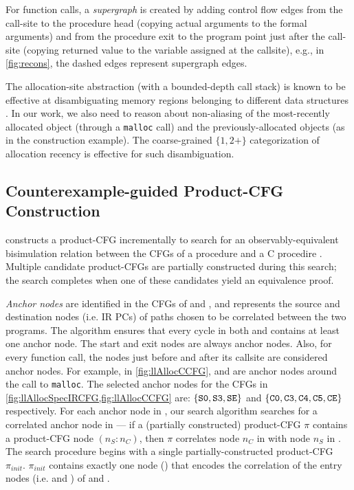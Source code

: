 For function calls, a {\em supergraph} is created by adding control flow edges
from the call-site to the procedure head (copying actual arguments to the formal arguments) and
from the procedure exit to the program point just after the
call-site (copying returned value to the variable assigned at the callsite),
e.g., in \cref{fig:recons}, the dashed edges represent supergraph edges.

The allocation-site abstraction (with a bounded-depth call stack) is
known to be effective at disambiguating memory regions belonging to
different data structures
\cite{allocationSiteAbstraction82,allocationSiteAbstraction90,allocationSiteAbstraction06}.
In our work, we also need to reason about non-aliasing
of the most-recently allocated object (through a {\tt malloc} call) and
the previously-allocated objects (as in the 
construction example). The coarse-grained $\{1, 2+\}$
categorization of allocation recency is effective for such disambiguation.

\subsection{Counterexample-guided Product-CFG Construction}
\label{sec:searchalgo}
\toolName{} constructs a product-CFG incrementally to search for an observably-equivalent
bisimulation relation between the CFGs of a \SpecL{} procedure \sprog{} and a C procedire \cprog{}.
Multiple candidate product-CFGs are partially constructed during this search;
the search completes when one of these candidates yield an equivalence proof.

{\em Anchor nodes} are identified in the CFGs of \sprog{} and \cprog{}, and represents the
source and destination nodes (i.e. IR PCs)
of paths chosen to be correlated between the two programs.
The algorithm ensures that every cycle in both \sprog{} and \cprog{} contains at least one anchor node.
The start and exit nodes are always anchor nodes.
Also, for every function call, the nodes just before and after its callsite are considered anchor nodes.
For example, in \cref{fig:llAllocCCFG},  and  are anchor nodes around the call to {\tt malloc}.
The selected anchor nodes for the CFGs in \cref{fig:llAllocSpecIRCFG,fig:llAllocCCFG} are:
$\{ {\tt S0},{\tt S3},{\tt SE} \}$ and $\{ {\tt C0}, {\tt C3}, {\tt C4}, {\tt C5}, {\tt CE} \}$ respectively.
For each anchor node in \cprog{}, our search algorithm searches for a correlated anchor node in \sprog{} --- if
a (partially constructed) product-CFG $\pi$ contains a product-CFG node  $(n_S\!:\!n_C)$, then $\pi$
correlates node $n_C$ in \cprog{} with node $n_S$ in \sprog{}.
The search procedure begins with a single partially-constructed product-CFG $\pi_{init}$.
$\pi_{init}$ contains exactly one node () that encodes the correlation of the entry nodes
(i.e.  and ) of \sprog{} and \cprog{}.

